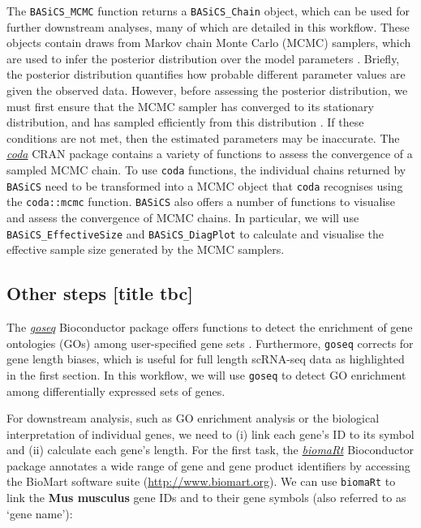 \documentclass[9pt,a4paper,]{extarticle}
\begin{document}
The \texttt{BASiCS\_MCMC} function returns a \texttt{BASiCS\_Chain} object, which can be used
for further downstream analyses, many of which are detailed in this workflow.
These objects contain draws from Markov chain Monte Carlo (MCMC) samplers,
which are used to infer the posterior distribution over the model parameters
\citep{Smith1993}.
Briefly, the posterior distribution quantifies how probable different parameter
values are given the observed data. However, before assessing the posterior
distribution, we must first ensure that the MCMC sampler has converged to
its stationary distribution, and has sampled efficiently from this distribution
\citep{Cowles1996}. If these conditions are not met, then the estimated parameters
may be inaccurate. The \emph{\href{https://CRAN.R-project.org/package=coda}{coda}} CRAN package contains a variety of
functions to assess the convergence of a sampled MCMC chain.
To use \texttt{coda} functions, the individual chains returned by \texttt{BASiCS} need to be
transformed into a MCMC object that \texttt{coda} recognises using the \texttt{coda::mcmc}
function. \texttt{BASiCS} also offers a number of functions to visualise and assess the
convergence of MCMC chains. In particular, we will use
\texttt{BASiCS\_EffectiveSize} and \texttt{BASiCS\_DiagPlot} to calculate and visualise the
effective sample size generated by the MCMC samplers.

\hypertarget{other-steps-title-tbc}{%
\subsection{Other steps {[}title tbc{]}}\label{other-steps-title-tbc}}

The \emph{\href{https://bioconductor.org/packages/3.11/goseq}{goseq}} Bioconductor package offers functions to detect the
enrichment of gene ontologies (GOs) among user-specified gene sets \citep{Young2010}.
Furthermore, \texttt{goseq} corrects for gene length biases, which is useful for full
length scRNA-seq data as highlighted in the first section.
In this workflow, we will use \texttt{goseq} to detect GO enrichment among
differentially expressed sets of genes.

For downstream analysis, such as GO enrichment analysis or the biological
interpretation of individual genes, we need to (i) link each gene's ID to its
symbol and (ii) calculate each gene's length.
For the first task, the \emph{\href{https://bioconductor.org/packages/3.11/biomaRt}{biomaRt}} Bioconductor package annotates a
wide range of gene and gene product identifiers \citep{Durinck2005} by accessing the
BioMart software suite (\url{http://www.biomart.org}).
We can use \texttt{biomaRt} to link the \textbf{Mus musculus} gene IDs and to their gene
symbols (also referred to as `gene name'):

{\small}
\end{document}
